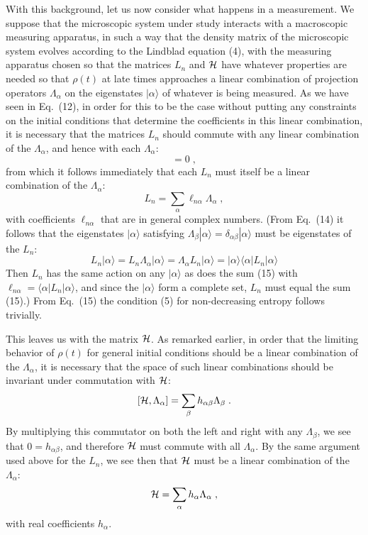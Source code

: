 With this background, let us now consider what happens in a measurement.  We suppose that the microscopic system under study interacts with a macroscopic measuring apparatus, in such a way that the density matrix of the microscopic system evolves according to the Lindblad equation (4), with the measuring apparatus chosen so that the matrices $L_n$ and ${\cal H}$ have whatever properties are needed so that $\rho(t)$ at late times approaches a linear combination of projection operators $\Lambda_\alpha$ on the eigenstates $|\alpha\rangle$ of whatever is being measured.  As we have seen in Eq.~(12), in order for this to be the case without putting any constraints on the initial conditions that determine the coefficients in this linear combination, it is necessary that the matrices $L_n$ should commute with any linear combination of the $\Lambda_\alpha$, and hence with each 
$\Lambda_\alpha$:
\begin{equation}[L_n,\Lambda_\alpha]=0\;,          \end{equation}
from which it follows immediately that each $L_n$ must itself be a linear combination of the $\Lambda_\alpha$:
\begin{equation}
 L_n=\sum_\alpha \ell_{n\alpha}\Lambda_\alpha\;,
\end{equation}
with coefficients $\ell_{n\alpha}$ that are in general complex numbers.
(From Eq.~(14) it follows that  the eigenstates $|\alpha\rangle$  satisfying $\Lambda_\beta|\alpha\rangle=\delta_{\alpha\beta}|\alpha\rangle$ must be eigenstates of the $L_n$:
$$ L_n|\alpha\rangle=L_n\Lambda_\alpha|\alpha\rangle=\Lambda_\alpha L_n|\alpha\rangle=|\alpha\rangle \langle \alpha|L_n|\alpha\rangle$$
Then $L_n$ has the same action on any $|\alpha\rangle$ as does the sum (15) with $\ell_{n\alpha}= \langle \alpha|L_n|\alpha\rangle$, and since the $|\alpha\rangle$ form a complete set, $L_n$ must equal the sum (15).)  From Eq.~(15) the condition (5) for non-decreasing entropy follows trivially.

This leaves us with the matrix ${\cal H}$.  As remarked earlier, in order that the limiting behavior of $\rho(t)$ for general initial conditions should be a linear combination of the $\Lambda_\alpha$, it is necessary that the space of such linear combinations should be invariant under commutation with ${\cal H}$:
$$
[{\cal H},\Lambda_\alpha]=\sum_\beta h_{\alpha\beta}\Lambda_\beta\;.
$$
By multiplying this commutator on both the left and right with any $\Lambda_\beta$, we see that $0=h_{\alpha\beta}$, and therefore ${\cal H}$ must commute with all $\Lambda_\alpha$.  By the same argument used above for the $L_n$, we see then that ${\cal H}$ must be a linear combination of the $\Lambda_\alpha$:
\begin{equation}
{\cal H}=\sum_\alpha h_\alpha\Lambda_\alpha\;,
\end{equation}
with real coefficients $h_\alpha$.

